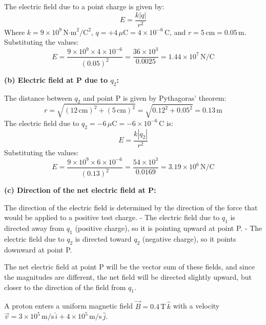 \documentclass[addpoints]{exam}
\begin{document}
\begin{questions}
\begin{solution}[16cm]
The electric field due to a point charge is given by:  
\[
E = \frac{k |q|}{r^2}
\]  
Where \( k = 9 \times 10^9 \, \text{N·m}^2/\text{C}^2 \), \( q = +4 \, \mu\text{C} = 4 \times 10^{-6} \, \text{C} \), and \( r = 5 \, \text{cm} = 0.05 \, \text{m} \).  
Substituting the values:  
\[
E = \frac{9 \times 10^9 \times 4 \times 10^{-6}}{(0.05)^2} = \frac{36 \times 10^3}{0.0025} = 1.44 \times 10^7 \, \text{N/C}
\]  

\textbf{(b) Electric field at P due to \(q_2\):}  

The distance between \(q_2\) and point P is given by Pythagoras’ theorem:  
\[
r = \sqrt{(12 \, \text{cm})^2 + (5 \, \text{cm})^2} = \sqrt{0.12^2 + 0.05^2} = 0.13 \, \text{m}
\]  
The electric field due to \(q_2 = -6 \, \mu\text{C} = -6 \times 10^{-6} \, \text{C}\) is:  
\[
E = \frac{k |q_2|}{r^2}
\]  
Substituting the values:  
\[
E = \frac{9 \times 10^9 \times 6 \times 10^{-6}}{(0.13)^2} = \frac{54 \times 10^3}{0.0169} = 3.19 \times 10^6 \, \text{N/C}
\]  

\textbf{(c) Direction of the net electric field at P:}  

The direction of the electric field is determined by the direction of the force that would be applied to a positive test charge.  
- The electric field due to \(q_1\) is directed away from \(q_1\) (positive charge), so it is pointing upward at point P.  
- The electric field due to \(q_2\) is directed toward \(q_2\) (negative charge), so it points downward at point P.

The net electric field at point P will be the vector sum of these fields, and since the magnitudes are different, the net field will be directed slightly upward, but closer to the direction of the field from \(q_1\).

\end{solution}

\question A proton enters a uniform magnetic field \( \vec{B} = 0.4 \, \text{T} \, \hat{k} \) with a velocity \( \vec{v} = 3 \times 10^5 \, \text{m/s} \, \hat{i} + 4 \times 10^5 \, \text{m/s} \, \hat{j} \).  
\end{questions}
\end{document}
